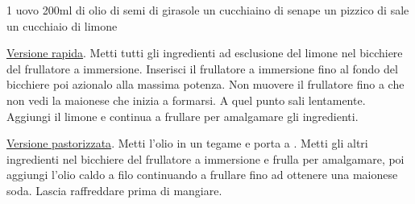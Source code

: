 \label{maionese}
\begin{ingreds}
	1 uovo
	200ml di olio di semi di girasole
	un cucchiaino di senape
	un pizzico di sale
	un cucchiaio di limone

\end{ingreds}

\begin{method}
\underline{Versione rapida}. Metti tutti gli ingredienti ad esclusione del limone nel bicchiere del frullatore a immersione. Inserisci il frullatore a immersione fino al fondo del bicchiere poi azionalo alla massima potenza. Non muovere il frullatore fino a che non vedi la maionese che inizia a formarsi. A quel punto sali lentamente. Aggiungi il limone e continua a frullare per amalgamare gli ingredienti.

\underline{Versione pastorizzata}. Metti l'olio in un tegame e porta a . Metti gli altri ingredienti nel bicchiere del frullatore a immersione e frulla per amalgamare, poi aggiungi l'olio caldo a filo continuando a frullare fino ad ottenere una maionese soda. Lascia raffreddare prima di mangiare.




\end{method}



